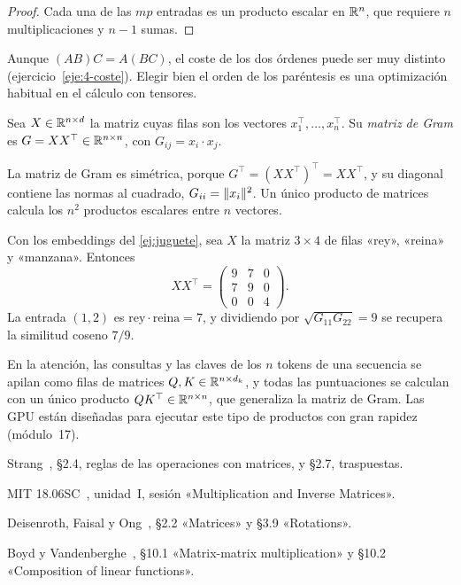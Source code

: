 \begin{proof}
Cada una de las $mp$ entradas es un producto escalar en $\mathbb{R}^{n}$, que requiere $n$ multiplicaciones y $n-1$ sumas.
\end{proof}

Aunque $(AB)C=A(BC)$, el coste de los dos órdenes puede ser muy distinto (ejercicio~\ref{eje:4-coste}). Elegir bien el orden de los paréntesis es una optimización habitual en el cálculo con tensores.

\begin{definicion}\label{def:gram}
Sea $X\in\mathbb{R}^{n\times d}$ la matriz cuyas filas son los vectores $x_1^{\top},\dots,x_n^{\top}$. Su \emph{matriz de Gram} es $G=XX^{\top}\in\mathbb{R}^{n\times n}$, con $G_{ij}=x_i\cdot x_j$.
\end{definicion}

La matriz de Gram es simétrica, porque $G^{\top}=(XX^{\top})^{\top}=XX^{\top}$, y su diagonal contiene las normas al cuadrado, $G_{ii}=\lVert x_i\rVert^{2}$. Un único producto de matrices calcula los $n^{2}$ productos escalares entre $n$ vectores.

\begin{ejemplo}\label{ej:gram}
Con los embeddings del \cref{ej:juguete}, sea $X$ la matriz $3\times 4$ de filas «rey», «reina» y «manzana». Entonces
\[
XX^{\top}=\begin{pmatrix}9&7&0\\7&9&0\\0&0&4\end{pmatrix}.
\]
La entrada $(1,2)$ es $\text{rey}\cdot\text{reina}=7$, y dividiendo por $\sqrt{G_{11}G_{22}}=9$ se recupera la similitud coseno $7/9$.
\end{ejemplo}

\begin{observacion}
En la atención, las consultas y las claves de los $n$ tokens de una secuencia se apilan como filas de matrices $Q,K\in\mathbb{R}^{n\times d_k}$, y todas las puntuaciones se calculan con un único producto $QK^{\top}\in\mathbb{R}^{n\times n}$, que generaliza la matriz de Gram. Las GPU están diseñadas para ejecutar este tipo de productos con gran rapidez (módulo~17).
\end{observacion}

\begin{lecturas}
\item Strang~\cite{strang}, §2.4, reglas de las operaciones con matrices, y §2.7, traspuestas.
\item MIT 18.06SC~\cite{mit1806sc}, unidad~I, sesión «Multiplication and Inverse Matrices».
\item Deisenroth, Faisal y Ong~\cite{mml}, §2.2 «Matrices» y §3.9 «Rotations».
\item Boyd y Vandenberghe~\cite{vmls}, §10.1 «Matrix-matrix multiplication» y §10.2 «Composition of linear functions».
\end{lecturas}

